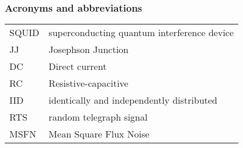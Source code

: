 \newpage
\subsubsection*{Acronyms and abbreviations}

\begingroup
\renewcommand{\arraystretch}{1.2}
\begin{tabular}{@{}p{2.5cm} l}
    SQUID      & superconducting quantum interference device \\
    JJ         & Josephson Junction \\
    DC         & Direct current \\
    RC         & Resistive-capacitive \\ 
    IID        & identically and independently distributed \\
    RTS        & random telegraph signal \\
    MSFN       & Mean Square Flux Noise \\
\end{tabular}
\endgroup
